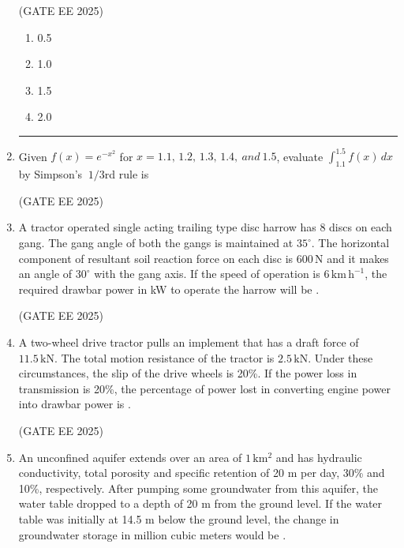 \documentclass[journal,12pt,onecolumn]{IEEEtran}
\theoremstyle{remark}
\begin{document}
\begin{enumerate}
\hfill(GATE EE 2025)

\begin{multicols}{4}
\begin{enumerate}
    \item 0.5
    \item 1.0
    \item 1.5
    \item 2.0
\end{enumerate}
\end{multicols}


\vspace{0.35em}
\hrule
\vspace{0.75cm}

\item Given $f(x)= e^{-x^2}$ for $x=1.1,\,1.2,\,1.3,\,1.4,\ and\ 1.5$, evaluate $\displaystyle \int_{1.1}^{1.5} f(x)\,dx$ by Simpson's $\ 1/3$rd rule is \underline{\hspace{2.5cm}}

\hfill(GATE EE 2025)

\item A tractor operated single acting trailing type disc harrow has 8 discs on each gang. The gang angle of both the gangs is maintained at $35^{\circ}$. The horizontal component of resultant soil reaction force on each disc is $600\,\mathrm{N}$ and it makes an angle of $30^{\circ}$ with the gang axis. If the speed of operation is $6\,\mathrm{km\,h^{-1}}$, the required drawbar power in kW to operate the harrow will be \underline{\hspace{2.5cm}}. 

\hfill(GATE EE 2025)

\item A two-wheel drive tractor pulls an implement that has a draft force of $11.5\,\mathrm{kN}$. The total motion resistance of the tractor is $2.5\,\mathrm{kN}$. Under these circumstances, the slip of the drive wheels is 20\%. If the power loss in transmission is 20\%, the percentage of power lost in converting engine power into drawbar power is \underline{\hspace{2.5cm}}.

\hfill(GATE EE 2025)

\item An unconfined aquifer extends over an area of $1\,\mathrm{km^2}$ and has hydraulic conductivity, total porosity and specific retention of 20 m per day, 30\% and 10\%, respectively. After pumping some groundwater from this aquifer, the water table dropped to a depth of 20 m from the ground level. If the water table was initially at 14.5 m below the ground level, the change in groundwater storage in million cubic meters would be \underline{\hspace{2.5cm}}. 


\end{enumerate}
\end{document}

